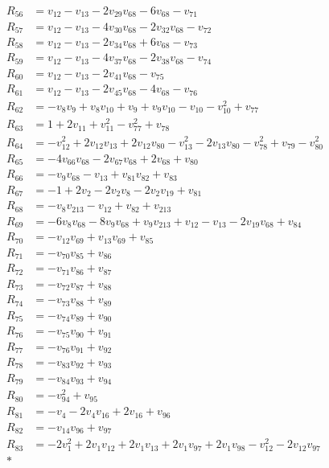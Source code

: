 \begin{align*}
R_{56}&=v_{12}-v_{13}-2v_{29}v_{68}-6v_{68}-v_{71}\\[2pt]
R_{57}&=v_{12}-v_{13}-4v_{30}v_{68}-2v_{32}v_{68}-v_{72}\\[2pt]
R_{58}&=v_{12}-v_{13}-2v_{34}v_{68}+6v_{68}-v_{73}\\[2pt]
R_{59}&=v_{12}-v_{13}-4v_{37}v_{68}-2v_{38}v_{68}-v_{74}\\[2pt]
R_{60}&=v_{12}-v_{13}-2v_{41}v_{68}-v_{75}\\[2pt]
R_{61}&=v_{12}-v_{13}-2v_{45}v_{68}-4v_{68}-v_{76}\\[2pt]
R_{62}&=-v_{8}v_{9}+v_{8}v_{10}+v_{9}+v_{9}v_{10}-v_{10}-v_{10}^{2}+v_{77}\\[2pt]
R_{63}&=1+2v_{11}+v_{11}^{2}-v_{77}^{2}+v_{78}\\[2pt]
R_{64}&=-v_{12}^{2}+2v_{12}v_{13}+2v_{12}v_{80}-v_{13}^{2}-2v_{13}v_{80}-v_{78}^{2}+v_{79}-v_{80}^{2}\\[2pt]
R_{65}&=-4v_{66}v_{68}-2v_{67}v_{68}+2v_{68}+v_{80}\\[2pt]
R_{66}&=-v_{9}v_{68}-v_{13}+v_{81}v_{82}+v_{83}\\[2pt]
R_{67}&=-1+2v_{2}-2v_{2}v_{8}-2v_{2}v_{19}+v_{81}\\[2pt]
R_{68}&=-v_{8}v_{213}-v_{12}+v_{82}+v_{213}\\[2pt]
R_{69}&=-6v_{8}v_{68}-8v_{9}v_{68}+v_{9}v_{213}+v_{12}-v_{13}-2v_{19}v_{68}+v_{84}\\[2pt]
R_{70}&=-v_{12}v_{69}+v_{13}v_{69}+v_{85}\\[2pt]
R_{71}&=-v_{70}v_{85}+v_{86}\\[2pt]
R_{72}&=-v_{71}v_{86}+v_{87}\\[2pt]
R_{73}&=-v_{72}v_{87}+v_{88}\\[2pt]
R_{74}&=-v_{73}v_{88}+v_{89}\\[2pt]
R_{75}&=-v_{74}v_{89}+v_{90}\\[2pt]
R_{76}&=-v_{75}v_{90}+v_{91}\\[2pt]
R_{77}&=-v_{76}v_{91}+v_{92}\\[2pt]
R_{78}&=-v_{83}v_{92}+v_{93}\\[2pt]
R_{79}&=-v_{84}v_{93}+v_{94}\\[2pt]
R_{80}&=-v_{94}^{2}+v_{95}\\[2pt]
R_{81}&=-v_{4}-2v_{4}v_{16}+2v_{16}+v_{96}\\[2pt]
R_{82}&=-v_{14}v_{96}+v_{97}\\[2pt]
R_{83}&=-2v_{1}^{2}+2v_{1}v_{12}+2v_{1}v_{13}+2v_{1}v_{97}+2v_{1}v_{98}-v_{12}^{2}-2v_{12}v_{97}\\*

\end{align*}
